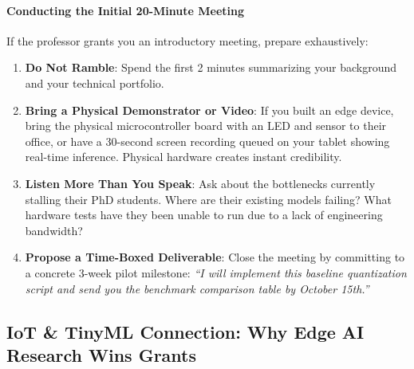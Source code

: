 \paragraph{Conducting the Initial 20-Minute Meeting}
If the professor grants you an introductory meeting, prepare exhaustively:
\begin{enumerate}
    \item \textbf{Do Not Ramble}: Spend the first 2 minutes summarizing your background and your technical portfolio.
    \item \textbf{Bring a Physical Demonstrator or Video}: If you built an edge device, bring the physical microcontroller board with an LED and sensor to their office, or have a 30-second screen recording queued on your tablet showing real-time inference. Physical hardware creates instant credibility.
    \item \textbf{Listen More Than You Speak}: Ask about the bottlenecks currently stalling their PhD students. Where are their existing models failing? What hardware tests have they been unable to run due to a lack of engineering bandwidth?
    \item \textbf{Propose a Time-Boxed Deliverable}: Close the meeting by committing to a concrete 3-week pilot milestone: \emph{``I will implement this baseline quantization script and send you the benchmark comparison table by October 15th.''}
\end{enumerate}

\subsection{IoT \& TinyML Connection: Why Edge AI Research Wins Grants}\label{subsec:tinyml_grants}

